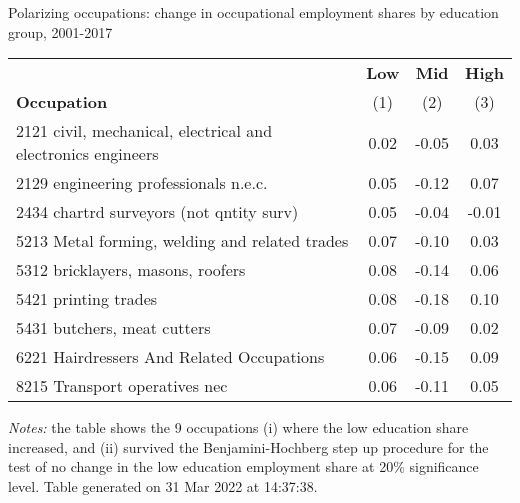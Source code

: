 \begin{center}
\begin{threeparttable}[!h]
\caption{Polarizing occupations: change in occupational employment shares by education group, 2001-2017}
\begin{tabular}{lccc}
\toprule
\toprule
&\multicolumn{1}{c}{\textbf{Low}}&\multicolumn{1}{c}{\textbf{Mid}}&\multicolumn{1}{c}{\textbf{High}} \\
\textbf{Occupation}&\multicolumn{1}{c}{(1)}&\multicolumn{1}{c}{(2)}&\multicolumn{1}{c}{(3)} \\
\midrule
2121 civil, mechanical, electrical and electronics engineers&        0.02&       -0.05&        0.03\\
2129 engineering professionals n.e.c.&        0.05&       -0.12&        0.07\\
2434 chartrd surveyors (not qntity surv)&        0.05&       -0.04&       -0.01\\
5213 Metal forming, welding and related trades&        0.07&       -0.10&        0.03\\
5312 bricklayers, masons, roofers&        0.08&       -0.14&        0.06\\
5421 printing trades&        0.08&       -0.18&        0.10\\
5431 butchers, meat cutters&        0.07&       -0.09&        0.02\\
6221 Hairdressers And Related Occupations&        0.06&       -0.15&        0.09\\
8215 Transport operatives nec&        0.06&       -0.11&        0.05\\
\bottomrule
\bottomrule
\end{tabular}
\begin{tablenotes}
\item \footnotesize \textit{Notes:} the table shows the 9 occupations (i) where the low education share increased, and (ii) survived the Benjamini-Hochberg step up procedure for the test of no change in the low education employment share at 20\% significance level. Table generated on 31 Mar 2022 at 14:37:38.
\end{tablenotes}
\end{threeparttable}
\end{center}
